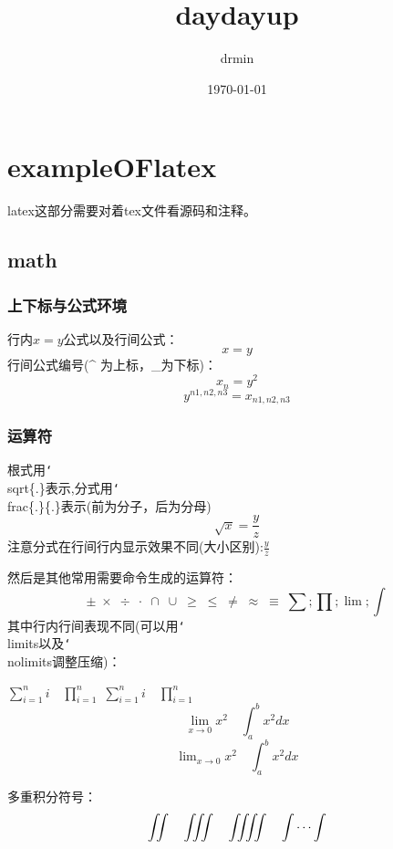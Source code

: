 \documentclass[UTF8]{ctexart}
\title{daydayup}
\author{drmin}
\date{\today}
\begin{document}
\maketitle
\newpage
\tableofcontents
\newpage
\section{exampleOFlatex}
latex这部分需要对着tex文件看源码和注释。
\subsection{math}
\subsubsection{上下标与公式环境}
行内$x=y$公式以及行间公式：\[x=y\]
行间公式编号(\^{} 为上标，\_{}为下标)：
\begin{equation}
x_n=y^2
\end{equation}
\begin{equation}
y^{n1,n2,n3}=x_{n1,n2,n3}
\end{equation}
\subsubsection{运算符}
根式用\texttt{\char`\\}sqrt\{.\}表示,分式用\texttt{\char`\\}frac\{.\}\{.\}表示(前为分子，后为分母)
\begin{equation}
\sqrt{x}=\frac{y}{z}
\end{equation}
注意分式在行间行内显示效果不同(大小区别):$\frac{y}{z}$
	
然后是其他常用需要命令生成的运算符：\[ \pm\;\times\;\div\;\cdot\;\cap\;\cup\;\geq\;\leq\;\neq\;\approx\;\equiv\;\sum;\prod;\lim;\int \]
其中行内行间表现不同(可以用\texttt{\char`\\}limits以及\texttt{\char`\\}nolimits调整压缩)：
	
$ \sum_{i=1}^n i\quad \prod_{i=1}^n $
$ \sum\limits _{i=1}^n i\quad \prod\limits _{i=1}^n $
\[ \lim_{x\to0}x^2 \quad \int_a^b x^2 dx \]
\[ \lim\nolimits _{x\to0}x^2\quad \int\nolimits_a^b x^2 dx \]
		
多重积分符号：\[ \iint\quad \iiint\quad \iiiint\quad \idotsint \]
		
\end{document}
